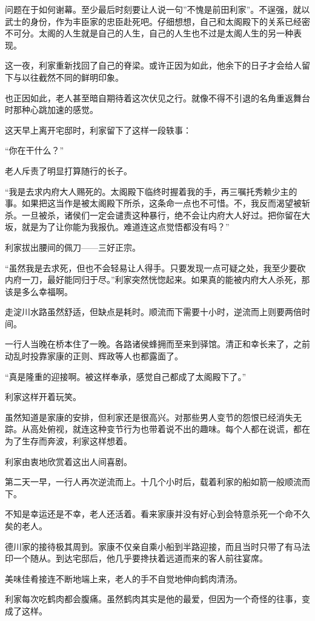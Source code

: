 \documentclass[
]{book}
\begin{document}
问题在于如何谢幕。至少最后时刻要让人说一句''不愧是前田利家''。不逞强，就以武士的身份，作为丰臣家的忠臣赴死吧。仔细想想，自己和太阁殿下的关系已经密不可分。太阁的人生就是自己的人生，自己的人生也不过是太阁人生的另一种表现。

这一夜，利家重新找回了自己的脊梁。或许正因为如此，他余下的日子才会给人留下与以往截然不同的鲜明印象。

也正因如此，老人甚至暗自期待着这次伏见之行。就像不得不引退的名角重返舞台时那种心跳加速的感觉。

这天早上离开宅邸时，利家留下了这样一段轶事：

``你在干什么？''

老人斥责了明显打算随行的长子。

``我是去求内府大人赐死的。太阁殿下临终时握着我的手，再三嘱托秀赖少主的事。如果把这当作是被太阁殿下所杀，这条命一点也不可惜。不，我反而渴望被斩杀。一旦被杀，诸侯们一定会谴责这种暴行，绝不会让内府大人好过。把你留在大坂，就是为了让你能为我报仇。难道连这点觉悟都没有吗？''

利家拔出腰间的佩刀------三好正宗。

``虽然我是去求死，但也不会轻易让人得手。只要发现一点可疑之处，我至少要砍内府一刀，最好能同归于尽。''利家突然恍惚起来。如果真的能被内府大人杀死，那该是多么幸福啊。

走淀川水路虽然舒适，但缺点是耗时。顺流而下需要十小时，逆流而上则要两倍时间。

一行人当晚在桥本住了一晚。各路诸侯蜂拥而至来到驿馆。清正和幸长来了，之前动乱时投靠家康的正则、辉政等人也都露面了。

``真是隆重的迎接啊。被这样奉承，感觉自己都成了太阁殿下了。''

利家这样开着玩笑。

虽然知道是家康的安排，但利家还是很高兴。对那些男人变节的怨恨已经消失无踪。从高处俯视，就连这种变节行为也带着说不出的趣味。每个人都在说谎，都在为了生存而奔波，利家这样想着。

利家由衷地欣赏着这出人间喜剧。

第二天一早，一行人再次逆流而上。十几个小时后，载着利家的船如箭一般顺流而下。

不知是幸运还是不幸，老人还活着。看来家康并没有好心到会特意杀死一个命不久矣的老人。

德川家的接待极其周到。家康不仅亲自乘小船到半路迎接，而且当时只带了有马法印一个随从。到达宅邸后，他几乎要搀扶着远道而来的客人前往宴席。

美味佳肴接连不断地端上来，老人的手不自觉地伸向鹤肉清汤。

利家每次吃鹤肉都会腹痛。虽然鹤肉其实是他的最爱，但因为一个奇怪的往事，变成了这样。
\end{document}
